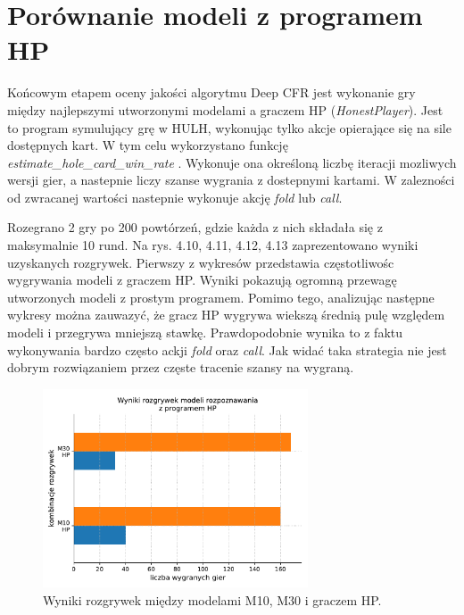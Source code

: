 \documentclass[12pt,oneside,a4paper]{report}
\begin{document}
\newpage
\section{Porównanie modeli z programem HP}

Końcowym etapem oceny jakości algorytmu Deep CFR jest wykonanie gry między najlepszymi
utworzonymi
modelami a graczem HP (\emph{HonestPlayer}). Jest to program symulujący grę w HULH, wykonując tylko 
akcje opierające się na sile dostępnych kart.
W tym celu wykorzystano funkcję 
\emph{estimate\_hole\_card\_win\_rate} \cite{PPE}. Wykonuje ona określoną liczbę iteracji 
mozliwych wersji gier, a
nastepnie liczy szanse wygrania z dostepnymi kartami. W zalezności od zwracanej wartości
nastepnie wykonuje akcję \emph{fold} lub \emph{call}. 

Rozegrano 2 gry po 200 powtórzeń, gdzie każda z nich składała się z maksymalnie 10 rund.
Na rys. 4.10, 4.11, 4.12, 4.13 zaprezentowano
wyniki uzyskanych rozgrywek. Pierwszy z wykresów przedstawia częstotliwośc wygrywania modeli z
graczem HP. Wyniki pokazują ogromną przewagę utworzonych modeli z prostym programem.
Pomimo tego, analizując następne wykresy
można zauwazyć, że gracz HP wygrywa wiekszą średnią pulę względem modeli i przegrywa  
mniejszą stawkę. Prawdopodobnie wynika to z faktu wykonywania bardzo często ackji \emph{fold} oraz
\emph{call}. Jak widać taka strategia nie jest dobrym rozwiązaniem przez częste tracenie szansy na
wygraną.




\begin{figure}[!ht]
  \centering
  \includegraphics[width=0.7\textwidth]{./img/honest1.pdf}
  \caption{Wyniki rozgrywek między modelami M10, M30 i graczem HP.}
\end{figure}
\end{document}
